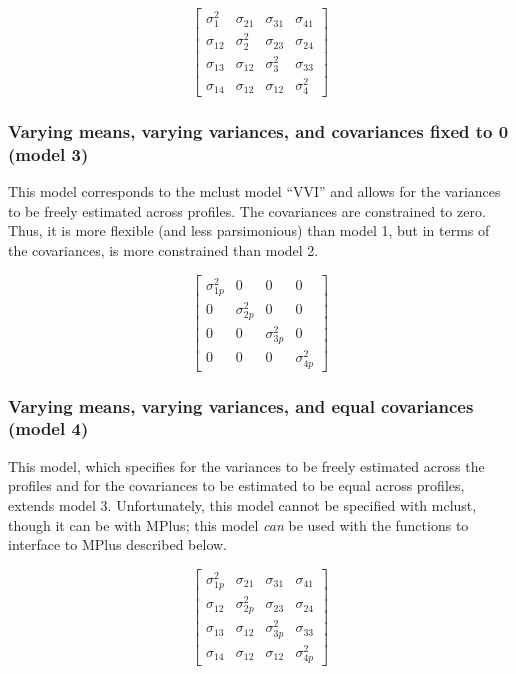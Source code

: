 \documentclass[]{msu-thesis}
\theoremstyle{definition}
\theoremstyle{definition}
\theoremstyle{definition}
\theoremstyle{remark}
\begin{document}
\[
\left[ \begin{matrix} { \sigma  }_{ 1 }^{ 2 } & { \sigma  }_{ 21 } & { \sigma  }_{ 31 } & { \sigma  }_{ 41 } \\ { \sigma  }_{ 12 } & { \sigma  }_{ 2 }^{ 2 } & { \sigma  }_{ 23 } & { \sigma  }_{ 24 } \\ { \sigma  }_{ 13 } & { \sigma  }_{ 12 } & { \sigma  }_{ 3 }^{ 2 } & { \sigma  }_{ 33 } \\ { \sigma  }_{ 14 } & { \sigma  }_{ 12 } & { \sigma  }_{ 12 } & { \sigma  }_{ 4 }^{ 2 } \end{matrix} \right] 
\]

\subsubsection{Varying means, varying variances, and covariances fixed
to 0 (model
3)}\label{varying-means-varying-variances-and-covariances-fixed-to-0-model-3}

This model corresponds to the mclust model ``VVI'' and allows for the
variances to be freely estimated across profiles. The covariances are
constrained to zero. Thus, it is more flexible (and less parsimonious)
than model 1, but in terms of the covariances, is more constrained than
model 2.

\[ 
\left[ \begin{matrix} { \sigma  }_{ 1p }^{ 2 } & 0 & 0 & 0 \\ 0 & { \sigma  }_{ 2p }^{ 2 } & 0 & 0 \\ 0 & 0 & { \sigma  }_{ 3p }^{ 2 } & 0 \\ 0 & 0 & 0 & { \sigma  }_{ 4p }^{ 2 } \end{matrix} \right] 
\]

\subsubsection{Varying means, varying variances, and equal covariances
(model
4)}\label{varying-means-varying-variances-and-equal-covariances-model-4}

This model, which specifies for the variances to be freely estimated
across the profiles and for the covariances to be estimated to be equal
across profiles, extends model 3. Unfortunately, this model cannot be
specified with mclust, though it can be with MPlus; this model
\emph{can} be used with the functions to interface to MPlus described
below.

\[
\left[ \begin{matrix} { \sigma  }_{ 1p }^{ 2 } & { \sigma  }_{ 21 } & { \sigma  }_{ 31 } & { \sigma  }_{ 41 } \\ { \sigma  }_{ 12 } & { \sigma  }_{ 2p }^{ 2 } & { \sigma  }_{ 23 } & { \sigma  }_{ 24 } \\ { \sigma  }_{ 13 } & { \sigma  }_{ 12 } & { \sigma  }_{ 3p }^{ 2 } & { \sigma  }_{ 33 } \\ { \sigma  }_{ 14 } & { \sigma  }_{ 12 } & { \sigma  }_{ 12 } & { \sigma  }_{ 4p }^{ 2 } \end{matrix} \right] 
\]
\end{document}
